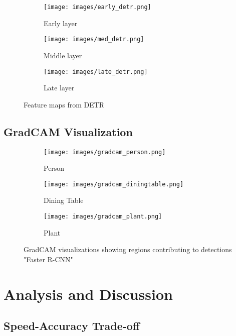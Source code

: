 \documentclass[12pt,a4paper]{article}
\begin{document}
\begin{figure}[H]
    \centering
    \begin{subfigure}[b]{0.3\textwidth}
        \texttt{[image: images/early\_detr.png]}
        \caption{Early layer}
    \end{subfigure}
    \hfill
    \begin{subfigure}[b]{0.3\textwidth}
        \texttt{[image: images/med\_detr.png]}
        \caption{Middle layer}
    \end{subfigure}
    \hfill
    \begin{subfigure}[b]{0.3\textwidth}
        \texttt{[image: images/late\_detr.png]}
        \caption{Late layer}
    \end{subfigure}
    \caption{Feature maps from DETR}
    \label{fig:detr_featuremaps}
\end{figure}

\subsection{GradCAM Visualization}

\begin{figure}[H]
    \centering
    \begin{subfigure}[b]{0.3\textwidth}
        \texttt{[image: images/gradcam\_person.png]}
        \caption{Person}
    \end{subfigure}
    \hfill
    \begin{subfigure}[b]{0.3\textwidth}
        \texttt{[image: images/gradcam\_diningtable.png]}
        \caption{Dining Table}
    \end{subfigure}
    \hfill
    \begin{subfigure}[b]{0.3\textwidth}
        \texttt{[image: images/gradcam\_plant.png]}
        \caption{Plant}
    \end{subfigure}
    \caption{GradCAM visualizations showing regions contributing to detections "Faster R-CNN"}
    \label{fig:gradcam_faster}
\end{figure}

\section{Analysis and Discussion}
\subsection{Speed-Accuracy Trade-off}
\end{document}
